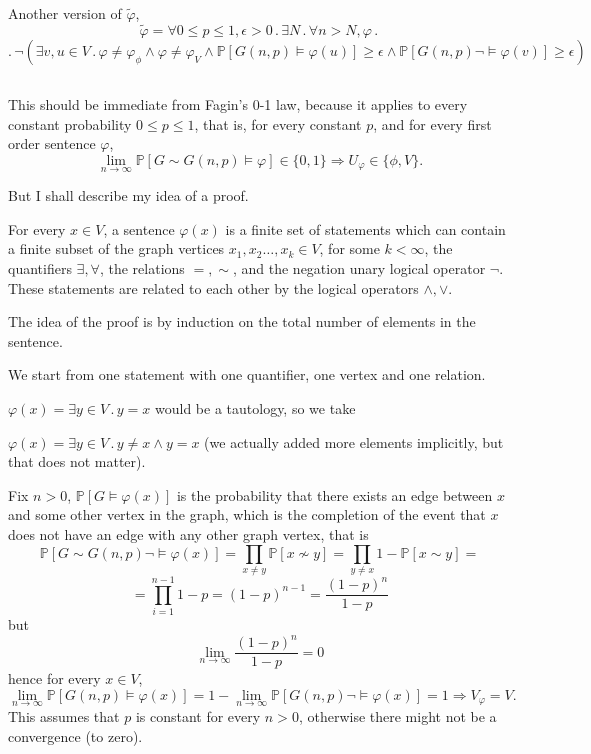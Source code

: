 \documentclass{article}
\begin{document}
Another version of $\tilde\varphi$,
\noindent
\[\tilde\varphi=\forall{0\leq{p}\leq{1}},\epsilon>0\,.\,\exists{N}\,.\,\forall{n>N},\varphi\,.\,\]\[.\,\neg(\exists{v,u\in{V}}\,.\,\varphi\neq\varphi_\phi\land\varphi\neq\varphi_V\land\mathbb{P}[G(n,p)\vDash\varphi(u)]\geq\epsilon\land\mathbb{P}[G(n,p)\neg\vDash\varphi(v)]\geq\epsilon)\]
\subsection{}
This should be immediate from Fagin's 0-1 law, because it applies to every constant probability $0\leq{p}\leq{1}$, that is, for every constant $p$, and for every first order sentence $\varphi$,
\[
\lim_{n\rightarrow\infty}\mathbb{P}[G\sim{G(n,p)}\vDash\varphi]\in\{0,1\}\Rightarrow{U_\varphi\in\{\phi,V\}}.
\]

But I shall describe my idea of a proof.

For every $x\in{V}$, a sentence $\varphi(x)$ is a finite set of statements which can contain a finite subset of the graph vertices $x_1,x_2\dots,x_k\in{V}$, for some $k<\infty$, the quantifiers $\exists,\forall$, the relations $=,\sim$, and the negation unary logical operator $\neg$. These statements are related to each other by the logical operators $\land,\lor$.

The idea of the proof is by induction on the total number of elements in the sentence.

We start from one statement with one quantifier, one vertex and one relation.

$\varphi(x)=\exists{y\in{V}}\,.\,y={x}$ would be a tautology, so we take 

$\varphi(x)=\exists{y\in{V}}\,.\,y\neq{x}\land{y={x}}$ (we actually added more elements implicitly, but that does not matter).

Fix $n>0$, $\mathbb{P}[G\vDash\varphi(x)]$ is the probability that there exists an edge between $x$ and some other vertex in the graph, which is the completion of the event that $x$ does not have an edge with any other graph vertex, that is \[\mathbb{P}[G\sim{G(n,p)}\neg\vDash\varphi(x)]=\prod_{x\neq{y}}\mathbb{P}[x\nsim{y}]=\prod_{y\neq{x}}1-\mathbb{P}[x\sim{y}]=\]\[=\prod_{i=1}^{n-1}1-p=(1-p)^{n-1}=\frac{(1-p)^n}{1-p}\]
but \[\lim_{n\rightarrow\infty}\frac{(1-p)^n}{1-p}=0\]
hence for every $x\in{V}$, \[\lim_{n\rightarrow\infty}\mathbb{P}[G(n,p)\vDash\varphi(x)]=1-\lim_{n\rightarrow\infty}\mathbb{P}[G(n,p)\neg\vDash\varphi(x)]=1\Rightarrow{V_\varphi={V}}.\]
This assumes that $p$ is constant for every $n>0$, otherwise there might not be a convergence (to zero).
\end{document}
